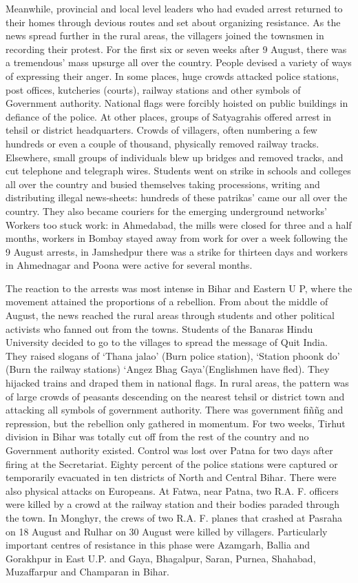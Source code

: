 \begin{multicols}{2}
Meanwhile, provincial and local level leaders who had evaded arrest returned to their homes through devious routes and set about organizing resistance. As the news spread further in the rural areas, the villagers joined the townsmen in recording their protest. For the first six or seven weeks after 9 August, there was a tremendous' mass upsurge all over the country. People devised a variety of ways of expressing their anger. In some places, huge crowds attacked police stations, post offices, kutcheries (courts), railway stations and other symbols of Government authority. National flags were forcibly hoisted on public buildings in defiance of the police. At other places, groups of Satyagrahis offered arrest in tehsil or district headquarters. Crowds of villagers, often numbering a few hundreds or even a couple of thousand, physically removed railway tracks. Elsewhere, small groups of individuals blew up bridges and removed tracks, and cut telephone and telegraph wires. Students went on strike in schools and colleges all over the country and busied themselves taking processions, writing and distributing illegal news-sheets: hundreds of these patrikas' came our all over the country. They also became couriers for the emerging underground networks' Workers too stuck work: in Ahmedabad, the mills were closed for three and a half months, workers in Bombay stayed away from work for over a week following the 9 August arrests, in Jamshedpur there was a strike for thirteen days and workers in Ahmednagar and Poona were active for several months.

The reaction to the arrests was most intense in Bihar and Eastern U P, where the movement attained the proportions of a rebellion. From about the middle of August, the news reached the rural areas through students and other political activists who fanned out from the towns. Students of the Banaras Hindu University decided to go to the villages to spread the message of Quit India. They raised slogans of `Thana jalao' (Burn police station), `Station phoonk do' (Burn the railway stations) `Angez Bhag Gaya'(Englishmen have fled). They hijacked trains and draped them in national flags. In rural areas, the pattern was of large crowds of peasants descending on the nearest tehsil or district town and attacking all symbols of government authority. There was government fiññg and repression, but the rebellion only gathered in momentum. For two weeks, Tirhut division in Bihar was totally cut off from the rest of the country and no Government authority existed. Control was lost over Patna for two days after firing at the Secretariat. Eighty percent of the police stations were captured or temporarily evacuated in ten districts of North and Central Bihar. There were also physical attacks on Europeans. At Fatwa, near Patna, two R.A. F. officers were killed by a crowd at the railway station and their bodies paraded through the town. In Monghyr, the crews of two R.A. F. planes that crashed at Pasraha on 18 August and Rulhar on 30 August were killed by villagers. Particularly important centres of resistance in this phase were Azamgarh, Ballia and Gorakhpur in East U.P. and Gaya, Bhagalpur, Saran, Purnea, Shahabad, Muzaffarpur and Champaran in Bihar.


\end{multicols}
